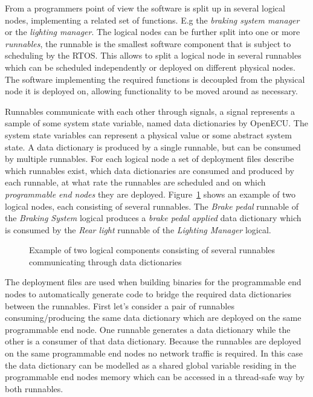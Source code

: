 From a programmers point of view the software is split up in several logical nodes, implementing a related set of functions. E.g the \textit{braking system manager} or the \textit{lighting manager}. The logical nodes can be further split into one or more \textit{runnables}, the runnable is the smallest software component that is subject to scheduling by the RTOS. This allows to split a logical node in several runnables which can be scheduled independently or deployed on different physical nodes. The software implementing the required functions is decoupled from the physical node it is deployed on, allowing functionality to be moved around as necessary.

Runnables communicate with each other through signals, a signal represents a sample of some system state variable, named data dictionaries by OpenECU. The system state variables can represent a physical value or some abstract system state. A data dictionary is produced by a single runnable, but can be consumed by multiple runnables. For each logical node a set of deployment files describe which runnables exist, which data dictionaries are consumed and produced by each runnable, at what rate the runnables are scheduled and on which \textit{programmable end nodes} they are deployed. Figure~\ref{fig:logical_example} shows an example of two logical nodes, each consisting of several runnables. The \textit{Brake pedal} runnable of the \textit{Braking System} logical produces a \textit{brake pedal applied} data dictionary which is consumed by the \textit{Rear light} runnable of the \textit{Lighting Manager} logical.

\begin{figure}[htb]
    \centering
 \caption{Example of two logical components consisting of several runnables communicating through data dictionaries}
\label{fig:logical_example}
\end{figure}

The deployment files are used when building binaries for the programmable end nodes to automatically generate code to bridge the required data dictionaries between the runnables. First let's consider a pair of runnables consuming/producing the same data dictionary which are deployed on the same programmable end node. One runnable generates a data dictionary while the other is a consumer of that data dictionary. Because the runnables are deployed on the same programmable end nodes no network traffic is required. In this case the data dictionary can be modelled as a shared global variable residing in the programmable end nodes memory which can be accessed in a thread-safe way by both runnables.

